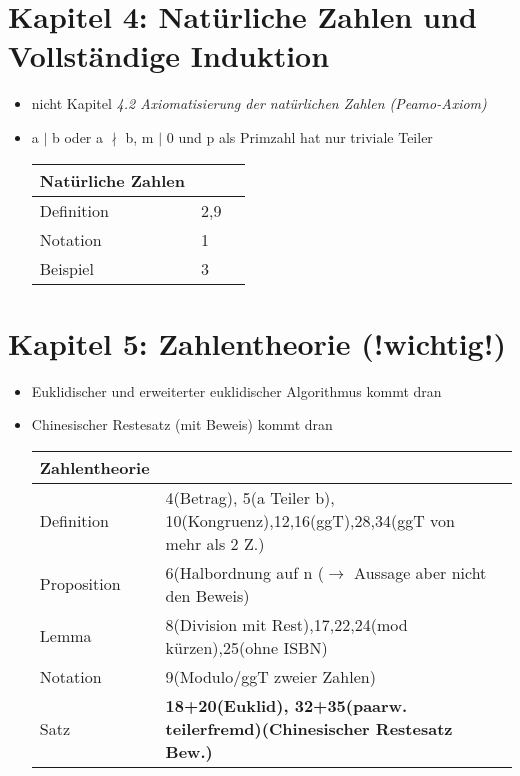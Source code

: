 \documentclass[11pt,a4paper]{article}
\begin{document}
\section*{Kapitel 4: Natürliche Zahlen und Vollständige Induktion}
\begin{itemize}
	\item nicht Kapitel \emph{4.2 Axiomatisierung der natürlichen Zahlen (Peamo-Axiom)}
	\item a $\mid$ b oder a $\nmid$ b, m $\mid$ 0 und p als Primzahl hat nur triviale Teiler
	\begin{center}
		\begin{tabular}{ | l | l | l | }
			\hline
			Natürliche Zahlen& \\ \hline	\hline	
			Definition&2,9\\ \hline
			Notation& 1\\ \hline
			Beispiel& 3\\ 
			\hline	
		\end{tabular}
	\end{center}	
\end{itemize}

\newpage

\section*{Kapitel 5: Zahlentheorie (!wichtig!)}
\begin{itemize}
	\item Euklidischer und erweiterter euklidischer Algorithmus kommt dran
	\item Chinesischer Restesatz (mit Beweis) kommt dran
	\begin{center}
		\begin{tabular}{ | l | l | l | }
			\hline
			Zahlentheorie& \\ \hline	\hline	
			Definition&4(Betrag), 5(a Teiler b), 10(Kongruenz),12,16(ggT),28,34(ggT von mehr als 2 Z.)\\ \hline
			Proposition&6(Halbordnung auf n ($\rightarrow$ Aussage aber nicht den Beweis)\\ \hline
			Lemma&8(Division mit Rest),17,22,24(mod kürzen),25(ohne ISBN)\\ \hline
			Notation&9(Modulo/ggT zweier Zahlen)\\ \hline
			Satz&\textbf{18+20(Euklid), 32+35(paarw. teilerfremd)(Chinesischer Restesatz Bew.)}\\ 
			\hline	
		\end{tabular}
	\end{center}	
\end{itemize}
\end{document}
